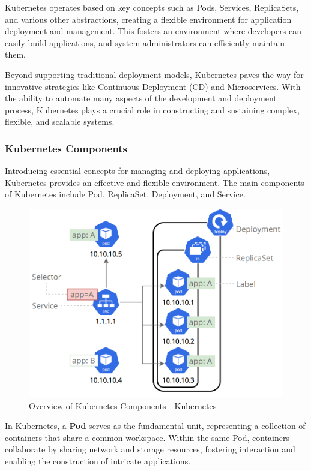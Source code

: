 Kubernetes operates based on key concepts such as Pods, Services, ReplicaSets,
and various other abstractions, creating a flexible environment for application
deployment and management. This fosters an environment where developers can
easily build applications, and system administrators can efficiently maintain
them.

Beyond supporting traditional deployment models, Kubernetes paves the way for
innovative strategies like Continuous Deployment (CD) and Microservices. With
the ability to automate many aspects of the development and deployment process,
Kubernetes plays a crucial role in constructing and sustaining complex,
flexible, and scalable systems.

\subsubsection{Kubernetes Components}

Introducing essential concepts for managing and deploying applications,
Kubernetes provides an effective and flexible environment. The main components
of Kubernetes include Pod, ReplicaSet, Deployment, and Service.

\begin{figure}[H]
    \centering
    \includegraphics[width=0.75\linewidth]{Images/3.4-k8s-comps.png}
    \caption{Overview of Kubernetes Components - Kubernetes}
    \label{fig:k8s-comps}
\end{figure}

In Kubernetes, a \textbf{Pod} serves as the fundamental unit, representing a
collection of containers that share a common workspace. Within the same Pod,
containers collaborate by sharing network and storage resources, fostering
interaction and enabling the construction of intricate applications.

